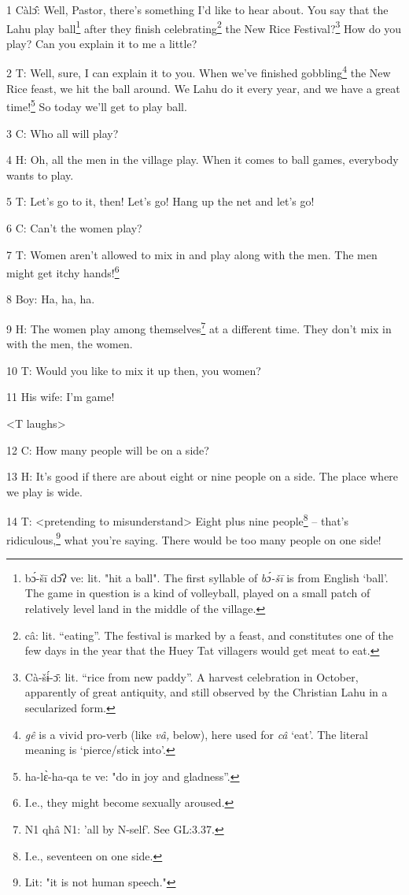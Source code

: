 
1 Càlɔ̂: Well, Pastor, there's something I'd like to hear about. You say that
the Lahu play ball\footnote{bɔ́-šī dɔ̂ʔ ve: lit. "hit a ball". The first syllable of \textit{bɔ́-šī}  is from English `ball'. The game in question is a kind of volleyball, played on a small patch of relatively level land in the middle of the village.} after they finish celebrating\footnote{câ: lit. ``eating''. The festival is marked by a feast, and constitutes one of the few days in the year that the Huey Tat villagers would get meat to eat.} the New Rice Festival?\footnote{Cà-šɨ́-ɔ̄: lit. ``rice from new paddy''. A harvest celebration in October, apparently of great antiquity, and still observed by the Christian Lahu in a secularized form.}
How do you play? Can you explain it to me a little?

2 T: Well, sure, I can explain it to you. When we've finished gobbling\footnote{\textit{gê} is a vivid pro-verb (like \textit{vâ,} below), here used for \textit{câ} `eat'. The literal meaning is `pierce/stick into'.} the New
Rice feast, we hit the ball around. We Lahu do it every year, and we have a great
time!\footnote{ha-lɛ̀-ha-qa te ve: "do in joy and gladness''.} So today we'll get to play ball.

3 C: Who all will play?

4 H: Oh, all the men in the village play. When it comes to ball games, everybody
wants to play.

5 T: Let's go to it, then! Let's go! Hang up the net and let's go!

6 C: Can't the women play?

7 T: Women aren't allowed to mix in and play along with the men. The men might
get itchy hands!\footnote{I.e., they might become sexually aroused.}

8 Boy: Ha, ha, ha.

9 H: The women play among themselves\footnote{N1 qhâ N1: 'all by N-self'. See GL:3.37.} at a different time. They don't mix in
with the men, the women.

10 T: Would you like to mix it up then, you women?

11 His wife: I'm game!

<T laughs>

12 C: How many people will be on a side?

13 H: It's good if there are about eight or nine people on a side. The place where
we play is wide.

14 T: <pretending to misunderstand> Eight plus nine people\footnote{I.e., seventeen on one side.}
-- that's ridiculous,\footnote{Lit: "it is not human speech."} what you're saying. There would be too many people on
one side!

